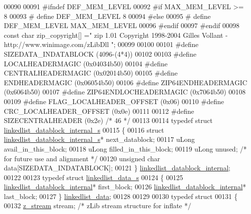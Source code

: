 \begin{DoxyCode}
00090 
00091 \textcolor{preprocessor}{#ifndef DEF\_MEM\_LEVEL}
00092 \textcolor{preprocessor}{#if MAX\_MEM\_LEVEL >= 8}
00093 \textcolor{preprocessor}{#  define DEF\_MEM\_LEVEL 8}
00094 \textcolor{preprocessor}{#else}
00095 \textcolor{preprocessor}{#  define DEF\_MEM\_LEVEL  MAX\_MEM\_LEVEL}
00096 \textcolor{preprocessor}{#endif}
00097 \textcolor{preprocessor}{#endif}
00098 \textcolor{keyword}{const} \textcolor{keywordtype}{char} zip\_copyright[] =\textcolor{stringliteral}{" zip 1.01 Copyright 1998-2004 Gilles Vollant - http://www.winimage.com/zLibDll
      "};
00099 
00100 
00101 \textcolor{preprocessor}{#define SIZEDATA\_INDATABLOCK (4096-(4*4))}
00102 
00103 \textcolor{preprocessor}{#define LOCALHEADERMAGIC    (0x04034b50)}
00104 \textcolor{preprocessor}{#define CENTRALHEADERMAGIC  (0x02014b50)}
00105 \textcolor{preprocessor}{#define ENDHEADERMAGIC      (0x06054b50)}
00106 \textcolor{preprocessor}{#define ZIP64ENDHEADERMAGIC      (0x6064b50)}
00107 \textcolor{preprocessor}{#define ZIP64ENDLOCHEADERMAGIC   (0x7064b50)}
00108 
00109 \textcolor{preprocessor}{#define FLAG\_LOCALHEADER\_OFFSET (0x06)}
00110 \textcolor{preprocessor}{#define CRC\_LOCALHEADER\_OFFSET  (0x0e)}
00111 
00112 \textcolor{preprocessor}{#define SIZECENTRALHEADER (0x2e) }\textcolor{comment}{/* 46 */}\textcolor{preprocessor}{}
00113 
00114 \textcolor{keyword}{typedef} \textcolor{keyword}{struct }\hyperlink{structlinkedlist__datablock__internal__s}{linkedlist\_datablock\_internal\_s}
00115 \{
00116   \textcolor{keyword}{struct }\hyperlink{structlinkedlist__datablock__internal__s}{linkedlist\_datablock\_internal\_s}* next\_datablock;
00117   uLong  avail\_in\_this\_block;
00118   uLong  filled\_in\_this\_block;
00119   uLong  unused; \textcolor{comment}{/* for future use and alignment */}
00120   \textcolor{keywordtype}{unsigned} \textcolor{keywordtype}{char} data[SIZEDATA\_INDATABLOCK];
00121 \} \hyperlink{structlinkedlist__datablock__internal__s}{linkedlist\_datablock\_internal};
00122 
00123 \textcolor{keyword}{typedef} \textcolor{keyword}{struct }\hyperlink{structlinkedlist__data__s}{linkedlist\_data\_s}
00124 \{
00125     \hyperlink{structlinkedlist__datablock__internal__s}{linkedlist\_datablock\_internal}* first\_block;
00126     \hyperlink{structlinkedlist__datablock__internal__s}{linkedlist\_datablock\_internal}* last\_block;
00127 \} \hyperlink{structlinkedlist__data__s}{linkedlist\_data};
00128 
00129 
00130 \textcolor{keyword}{typedef} \textcolor{keyword}{struct}
00131 \{
00132     \hyperlink{structz__stream__s}{z\_stream} stream;            \textcolor{comment}{/* zLib stream structure for inflate */}

\end{DoxyCode}

